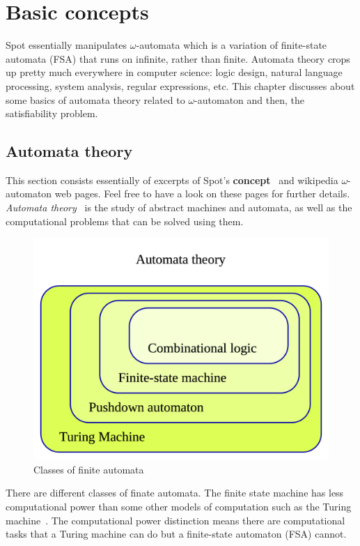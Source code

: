 \chapter{Basic concepts}
\label{basic_concepts}
Spot essentially manipulates $\omega$-automata which is a variation of finite-state automata (FSA) that runs
on infinite, rather than finite. Automata theory crops up pretty much everywhere in computer science:
logic design, natural language processing, system analysis, regular expressions, etc. This
chapter discusses about some basics of automata theory related to $\omega$-automaton and then, the
satisfiability problem.

\section{Automata theory}
This section consists essentially of excerpts of Spot's \textbf{concept}~\cite{8} and
wikipedia $\omega$-automaton web pages. Feel free to have a look on these pages for further details.\\

\noindent \textit{Automata theory}~\cite{9} is the study of abstract machines and automata, as well as the
computational problems that can be solved using them.

\begin{figure}[H]
 \centering
 \includegraphics[scale=0.2]{img/automata_classes.png}
 \caption{Classes of finite automata~\cite{9}}
 \label{fig:aut_classes}
\end{figure}
There are different classes of finate automata. The finite state machine has less computational power than
some other models of computation such as the Turing machine~\cite{10}. The computational power distinction
means there are computational tasks that a Turing machine can do but a finite-state automaton (FSA) cannot.\\

